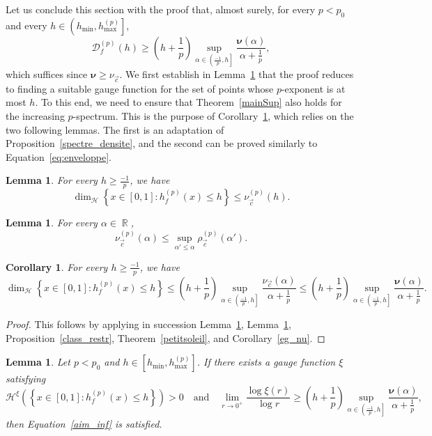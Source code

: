 \documentclass[a4paper,11pt,oneside]{article}
\DeclareMathOperator{\R}{\mathbb{R}}
\newcommand{\ccint}[1]{\left[{#1}\right]}
\newcommand{\ocint}[1]{\left({#1}\right]}
\theoremstyle{definition}
\theoremstyle{plain}
\newtheorem{lemma}[defi]{Lemma}
\newtheorem{cor}[defi]{Corollary}
\begin{document}
Let us conclude this section with the proof that, almost surely, for every $p<p_0$ and every \mbox{$h\in\ocint{h_{\min},h_{\max}^{(p)}}$},
\begin{equation}\label{aim_inf}
\mathscr{D}_f^{(p)}(h)\geq \left(h+\frac{1}{p}\right)\sup_{\alpha\in\ocint{\frac{-1}{p},h}}\frac{\bm{\nu}(\alpha)}{\alpha+\frac{1}{p}},
\end{equation}
which suffices since $\bm{\nu}\geq\nu_{\vec{c}}$. We first establish in Lemma~\ref{gauge} that the proof reduces  to finding a suitable gauge function for the set of points whose $p$-exponent is at most $h$. To this end, we need to ensure that Theorem~\ref{mainSup} also holds for the increasing $p$-spectrum. This is the purpose of Corollary~\ref{spectre_croissant2}, which relies on the two following lemmas. The first is an adaptation of Proposition~\ref{spectre_densite}, and the second  can be proved similarly to Equation~\eqref{eq:enveloppe}.

\begin{lemma}\label{spectre_croissant}
For every 
$h\geq\frac{-1}{p}$, we have
\[
\dim_{\mathcal{H}}\left\{x\in\ccint{0,1}:h_f^{(p)}(x)\leq h\right\}\leq \nu_{\vec{c}}^{(p)}(h).
\]
\end{lemma}

\begin{lemma}\label{enveloppep}
For every $\alpha\in\R$,
\[
\nu_{\vec{c}}^{(p)}(\alpha)\leq\sup_{\alpha'\leq \alpha} 
\rho_{\vec{c}}^{(p)}(\alpha').
\]
\end{lemma}

\begin{cor}\label{spectre_croissant2}
For every 
$h\geq\frac{-1}{p}$, we have
\[
\dim_{\mathcal{H}}\left\{x\in\ccint{0,1}:h_f^{(p)}(x)\leq h\right\}\leq \left(h+\frac{1}{p}\right)\sup_{\alpha\in\ocint{\frac{-1}{p},h}}\frac{\nu_{\vec{c}}(\alpha)}{\alpha+\frac{1}{p}}\leq \left(h+\frac{1}{p}\right)\sup_{\alpha\in\ocint{\frac{-1}{p},h}}\frac{\bm{\nu}(\alpha)}{\alpha+\frac{1}{p}}.
\]
\end{cor}


\begin{proof}
This follows by applying in succession Lemma~\ref{spectre_croissant}, Lemma~\ref{enveloppep}, Proposition~\ref{class_restr}, Theorem~\ref{petitsoleil}, and Corollary~\ref{eg_nu}.
\end{proof}

\begin{lemma}\label{gauge}
Let $p<p_0$ and $h\in\ccint{h_{\min},h_{\max}^{(p)}}$. If there exists a gauge function $\xi$ satisfying
\[
\mathcal{H}^\xi\left(\left\{x\in\ccint{0,1}:h_f^{(p)}(x)\leq h\right\}\right)>0\quad\text{and}\quad \lim_{r\rightarrow0^+}\frac{\log\xi(r)}{\log r}\geq \left(h+\frac{1}{p}\right)\sup_{\alpha\in\ocint{\frac{-1}{p},h}}\frac{\bm{\nu}(\alpha)}{\alpha+\frac{1}{p}},
\]
then Equation~\eqref{aim_inf} is satisfied.
\end{lemma}
\end{document}
